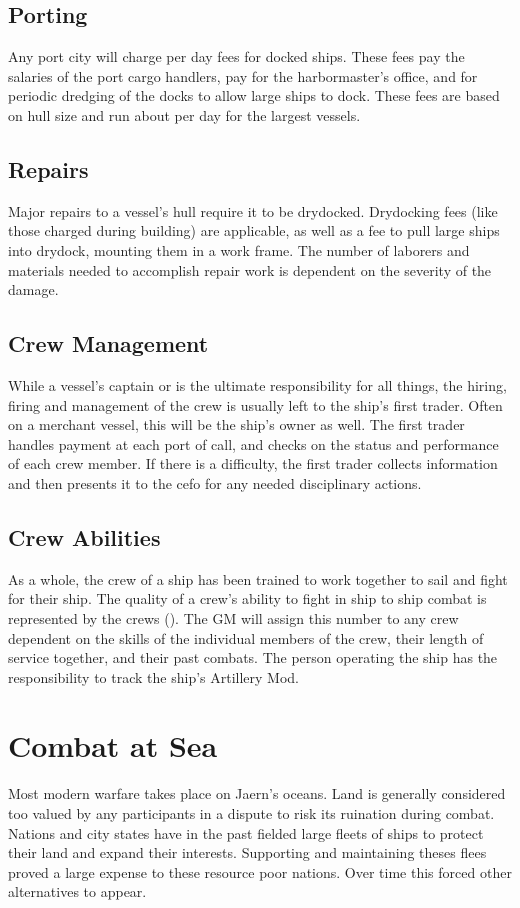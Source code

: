 \begin{multicols*}{2}
\subsection{Porting}
Any port city will charge per day fees for docked ships. These fees pay the salaries of the port cargo handlers, pay for the harbormaster's office, and for periodic dredging of the docks to allow large ships to dock. These fees are based on hull size and run about \tcdefine{100 sp} per day for the largest vessels.
\subsection{Repairs}
Major repairs to a vessel's hull require it to be drydocked. Drydocking fees (like those charged during building) are applicable, as well as a  fee to pull large ships into drydock, mounting them in a work frame. The number of laborers and materials needed to accomplish repair work is dependent on the severity of the damage.
\subsection{Crew Management}
While a vessel's captain or  is the ultimate responsibility for all things, the hiring, firing and management of the crew is usually left to the ship's first trader. Often on a merchant vessel, this will be the ship's owner as well. The first trader handles payment at each port of call, and checks on the status and performance of each crew member. If there is a difficulty, the first trader collects information and then presents it to the cefo for any needed disciplinary actions.
\subsection{Crew Abilities}
As a whole, the crew of a ship has been trained to work together to sail and fight for their ship. The quality of a crew's ability to fight in ship to ship combat is represented by
the crews  (\AM). The GM will assign this number to any crew dependent on the skills of the individual members of the crew, their length of service together, and their past combats. The person operating the ship has the responsibility to track the ship's Artillery Mod.
\section{Combat at Sea}
Most modern warfare takes place on Jaern's oceans. Land is generally considered too valued by any participants in a dispute to risk its ruination during combat. Nations and city
states have in the past fielded large fleets of ships to protect their land and expand their interests. Supporting and maintaining theses flees proved a large expense to these resource poor nations. Over time this forced other alternatives to appear.


\end{multicols*}
